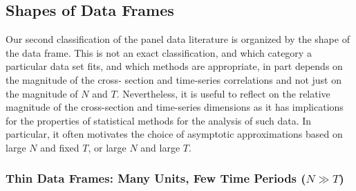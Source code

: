 \documentclass[letterpaper,12pt,leqno]{article}
\begin{document}
\subsection{Shapes of Data Frames}


Our second classification of the panel data literature is organized by the shape of the data
frame. This is not an exact classification, and which category a particular data set fits,
and which methods are appropriate, in part depends on the magnitude of the cross-
section and time-series correlations and not just on the magnitude of $N$ and $T$. Nevertheless, it is useful to reflect on the relative
magnitude of the cross-section and time-series dimensions as it has implications for the
properties of statistical methods for the analysis of such data. In particular, it often
motivates the choice of asymptotic approximations based on large $N$ and fixed $T$, or
large $N$ and large $T$.



\subsubsection{Thin Data Frames: Many Units, Few Time Periods ($N\gg T$)}\label{manyunits}
\end{document}
